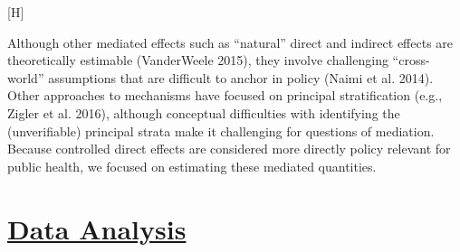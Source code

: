 \documentclass[
  letterpaper,
  DIV=11,
  numbers=noendperiod]{scrartcl}
\makeatletter
\renewenvironment{figure}%
   {\renewcommand\familydefault\sfdefault
    \@float{figure}}
   {\end@float}
\providecommand{\DIFadd}[1]{{\protect\color{blue}\underline{#1}}} %
\providecommand{\DIFaddbegin}{} %
\providecommand{\DIFaddend}{} %
\providecommand{\DIFdelbegin}{} %
\providecommand{\DIFdelend}{} %
\providecommand{\DIFaddbeginFL}{} %
\providecommand{\DIFaddendFL}{} %
\providecommand{\DIFdelbeginFL}{} %
\providecommand{\DIFdelendFL}{} %
\newcommand{\DIFscaledelfig}{0.5}
\newlength{\DIFdelgraphicswidth} %
\newlength{\DIFdelgraphicsheight} %
\newcommand{\DIFaddincludegraphics}[2][]{{\color{blue}\fbox{\DIFOincludegraphics[#1]{#2}}}} %
\newcommand{\DIFdelincludegraphics}[2][]{%
\sbox{\DIFdelgraphicsbox}{\DIFOincludegraphics[#1]{#2}}%
\settoboxwidth{\DIFdelgraphicswidth}{\DIFdelgraphicsbox} %
\settoboxtotalheight{\DIFdelgraphicsheight}{\DIFdelgraphicsbox} %
\scalebox{\DIFscaledelfig}{%
\parbox[b]{\DIFdelgraphicswidth}{\usebox{\DIFdelgraphicsbox}\\[-\baselineskip] \rule{\DIFdelgraphicswidth}{0em}}\llap{\resizebox{\DIFdelgraphicswidth}{\DIFdelgraphicsheight}{%
\setlength{\unitlength}{\DIFdelgraphicswidth}%
\begin{picture}(1,1)%
\thicklines\linethickness{2pt} %
{\color[rgb]{1,0,0}\put(0,0){\framebox(1,1){}}}%
{\color[rgb]{1,0,0}\put(0,0){\line( 1,1){1}}}%
{\color[rgb]{1,0,0}\put(0,1){\line(1,-1){1}}}%
\end{picture}%
}\hspace*{3pt}}} %
} %
\DeclareRobustCommand{\DIFaddbegin}{\DIFOaddbegin \let\includegraphics\DIFaddincludegraphics} %
\DeclareRobustCommand{\DIFaddend}{\DIFOaddend \let\includegraphics\DIFOincludegraphics} %
\DeclareRobustCommand{\DIFdelbegin}{\DIFOdelbegin \let\includegraphics\DIFdelincludegraphics} %
\DeclareRobustCommand{\DIFdelend}{\DIFOaddend \let\includegraphics\DIFOincludegraphics} %
\DeclareRobustCommand{\DIFaddbeginFL}{\DIFOaddbeginFL \let\includegraphics\DIFaddincludegraphics} %
\DeclareRobustCommand{\DIFaddendFL}{\DIFOaddendFL \let\includegraphics\DIFOincludegraphics} %
\DeclareRobustCommand{\DIFdelbeginFL}{\DIFOdelbeginFL \let\includegraphics\DIFdelincludegraphics} %
\DeclareRobustCommand{\DIFdelendFL}{\DIFOaddendFL \let\includegraphics\DIFOincludegraphics} %
\makeatother
\begin{document}
\begin{figure}[H]

\DIFdelbeginFL %
\DIFdelendFL \DIFaddbeginFL {}
\DIFaddendFL 

\DIFdelbeginFL %

\DIFdelendFL \caption{\label{fig-dag1}Hypothetical Directed Acyclic Graph showing
direct and indirect effects with outcome (\(Y\)), pre-treatment
covariates (\(X\)), policy (\(T\)), multiple mediators
(\(M_{1},M_{2}\)), as well as covariates for the mediators (\(W\)).}

\end{figure}%

Although other mediated effects such as ``natural'' direct and indirect
effects are theoretically estimable (VanderWeele 2015), they involve
challenging ``cross-world'' assumptions that are difficult to anchor in
policy (Naimi et al. 2014). Other approaches to mechanisms have focused
on principal stratification (e.g., Zigler et al. 2016), although
conceptual difficulties with identifying the (unverifiable) principal
strata make it challenging for questions of mediation. Because
controlled direct effects are considered more directly policy relevant
for public health, we focused on estimating these mediated quantities.

\DIFdelbegin %
\DIFdelend \DIFaddbegin \section{\DIFadd{Data Analysis}}\label{data-analysis}
\DIFaddend 
\end{document}
